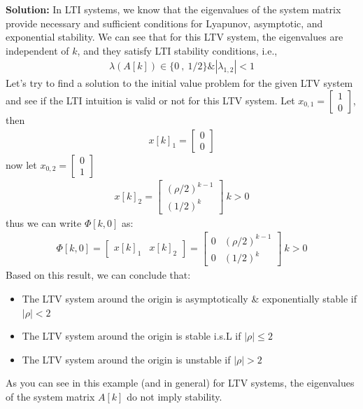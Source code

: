 \documentclass[twoside, 11pt]{article}
\begin{document}
\textbf{Solution:} In LTI systems, we know that the eigenvalues of the system matrix provide necessary and sufficient conditions for
Lyapunov, asymptotic, and exponential stability. We can see that for this LTV system, the eigenvalues are independent of $k$, and
they satisfy LTI stability conditions, i.e.,
%
\begin{align*}
  \lambda(A[k]) \in \lbrace 0 \ , \ 1/2 \rbrace \& | \lambda_{1,2} | < 1
\end{align*}
%
Let's try to find a solution to the initial value problem for the given LTV system and see if the LTI intuition is valid or not for this LTV system. Let $x_{0,1} = \begin{bmatrix} 1 \\ 0 \end{bmatrix}$, then
%
\begin{align*}
   x[k]_1 = \begin{bmatrix} 0 \\ 0 \end{bmatrix}
\end{align*}
%
now let $x_{0,2} = \begin{bmatrix} 0 \\ 1 \end{bmatrix}$
%
%
\begin{align*}
   x[k]_2 = \begin{bmatrix} (\rho/2)^{k-1} \\ (1/2)^k \end{bmatrix} \ k>0
\end{align*}
%
thus we can write $\Phi[k,0]$ as:
%
\begin{align*}
   \Phi[k,0] = \begin{bmatrix} x[k]_1 & x[k]_2 \end{bmatrix} = 
   \begin{bmatrix} 0 & (\rho/2)^{k-1} \\ 0 & (1/2)^{k} \end{bmatrix} \ k > 0 
\end{align*}
%
Based on this result, we can conclude that:
%
\begin{itemize}
    \item The LTV system around the origin is asymptotically \& exponentially stable if $|\rho| < 2$
    \item The LTV system around the origin is stable i.s.L if $|\rho| \leq 2$
    \item The LTV system around the origin is unstable if $|\rho| > 2$
\end{itemize}
%
As you can see in this example (and in general) for LTV systems, the eigenvalues of the system matrix $A[k]$ do not imply stability.
\end{document}
